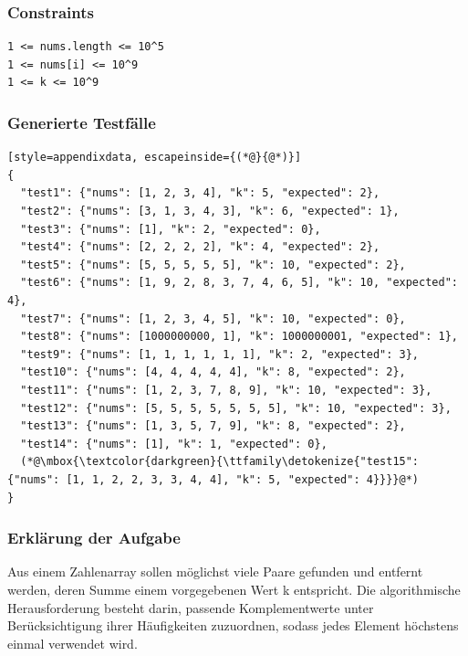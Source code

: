 \subsubsection*{Constraints}
\begin{lstlisting}[style=appendixdata]
1 <= nums.length <= 10^5
1 <= nums[i] <= 10^9
1 <= k <= 10^9
\end{lstlisting}

\subsubsection*{Generierte Testfälle}
\begin{lstlisting}[style=appendixdata, escapeinside={(*@}{@*)}]
{
  "test1": {"nums": [1, 2, 3, 4], "k": 5, "expected": 2},
  "test2": {"nums": [3, 1, 3, 4, 3], "k": 6, "expected": 1},
  "test3": {"nums": [1], "k": 2, "expected": 0},
  "test4": {"nums": [2, 2, 2, 2], "k": 4, "expected": 2},
  "test5": {"nums": [5, 5, 5, 5, 5], "k": 10, "expected": 2},
  "test6": {"nums": [1, 9, 2, 8, 3, 7, 4, 6, 5], "k": 10, "expected": 4},
  "test7": {"nums": [1, 2, 3, 4, 5], "k": 10, "expected": 0},
  "test8": {"nums": [1000000000, 1], "k": 1000000001, "expected": 1},
  "test9": {"nums": [1, 1, 1, 1, 1, 1], "k": 2, "expected": 3},
  "test10": {"nums": [4, 4, 4, 4, 4], "k": 8, "expected": 2},
  "test11": {"nums": [1, 2, 3, 7, 8, 9], "k": 10, "expected": 3},
  "test12": {"nums": [5, 5, 5, 5, 5, 5, 5], "k": 10, "expected": 3},
  "test13": {"nums": [1, 3, 5, 7, 9], "k": 8, "expected": 2},
  "test14": {"nums": [1], "k": 1, "expected": 0},
  (*@\mbox{\textcolor{darkgreen}{\ttfamily\detokenize{"test15": {"nums": [1, 1, 2, 2, 3, 3, 4, 4], "k": 5, "expected": 4}}}}@*)
}
\end{lstlisting}

\subsubsection*{Erklärung der Aufgabe}
Aus einem Zahlenarray sollen möglichst viele Paare gefunden und entfernt werden, deren Summe einem vorgegebenen Wert k entspricht. 
Die algorithmische Herausforderung besteht darin, passende Komplementwerte unter Berücksichtigung ihrer Häufigkeiten zuzuordnen, sodass jedes Element höchstens einmal 
verwendet wird.
